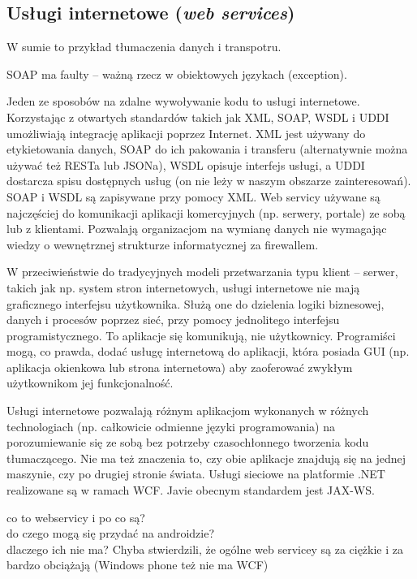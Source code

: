 \subsection{Usługi internetowe (\emph{web services})}
W sumie to przykład tłumaczenia danych  i transpotru.

SOAP ma faulty -- ważną rzecz w obiektowych językach (exception).

Jeden ze sposobów na zdalne wywoływanie kodu to usługi internetowe. Korzystając z otwartych standardów takich jak XML, SOAP, WSDL i UDDI umożliwiają integrację aplikacji poprzez Internet. XML jest używany do etykietowania danych, SOAP do ich pakowania i transferu (alternatywnie można używać też RESTa lub JSONa), WSDL opisuje interfejs usługi, a UDDI dostarcza spisu dostępnych usług (on nie leży w naszym obszarze zainteresowań). SOAP i WSDL są zapisywane przy pomocy XML. Web servicy używane są najczęściej do komunikacji aplikacji komercyjnych (np. serwery, portale) ze sobą lub z klientami. Pozwalają organizacjom na wymianę danych nie wymagając wiedzy o wewnętrznej strukturze informatycznej za firewallem.

W przeciwieństwie do tradycyjnych modeli przetwarzania typu klient – serwer, takich jak np. system stron internetowych, usługi internetowe nie mają graficznego interfejsu użytkownika. Służą one do dzielenia logiki biznesowej, danych i procesów poprzez sieć, przy pomocy jednolitego interfejsu programistycznego. To aplikacje się komunikują, nie użytkownicy. Programiści mogą, co prawda, dodać usługę internetową do aplikacji, która posiada GUI (np. aplikacja okienkowa lub strona internetowa) aby zaoferować zwykłym użytkownikom jej funkcjonalność.

Usługi internetowe pozwalają różnym aplikacjom wykonanych w różnych technologiach (np. całkowicie odmienne języki programowania) na porozumiewanie się ze sobą bez potrzeby czasochłonnego tworzenia kodu tłumaczącego. Nie ma też znaczenia to, czy obie aplikacje znajdują się na jednej maszynie, czy po drugiej stronie świata.
Usługi sieciowe na platformie .NET realizowane są w ramach WCF. Javie obecnym standardem jest JAX-WS.

co to webservicy i po co są?\\
do czego mogą się przydać na androidzie?\\
dlaczego ich nie ma? Chyba stwierdzili, że ogólne web servicey są za ciężkie i za bardzo obciążają (Windows phone też nie ma WCF)\\

